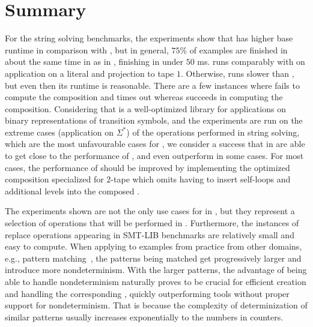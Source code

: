 \section{Summary}

For the string solving benchmarks, the experiments show that \mata has higher base runtime in comparison with \mona, but in general, $75 \%$ of examples are finished in about the same time in \mata as in \mona, finishing in under $50$ ms.
\mata runs comparably with \mona on application on a literal and projection to tape $1$.
Otherwise, \mata runs slower than \mona, but even then its runtime is reasonable.
There are a few instances where \mata fails to compute the composition and times out whereas \mona succeeds in computing the composition.
Considering that \mona is a well-optimized library for applications on binary representations of transition symbols, and the experiments are run on the extreme cases (application on $\Sigma^*$) of the operations performed in string solving, which are the most unfavourable cases for \mata, we consider a success that \nfts in \mata are able to get close to the performance of \mona, and even outperform \mona in some cases.
For most cases, the performance of \mata should be improved by implementing the optimized composition specialized for $2$-tape \nfts which omits having to insert self-loops and additional levels into the composed \nfts.

The experiments shown are not the only use cases for \nfts in \mata, but they represent a selection of operations that will be performed in \noodler.
Furthermore, the instances of replace operations appearing in SMT-LIB benchmarks are relatively small and easy to compute.
When applying \nfts to examples from practice from other domains, e.g., pattern matching~\cite{10.1007/978-3-031-30829-1_19}, the patterns being matched get progressively larger and introduce more nondeterminism.
With the larger patterns, the advantage of \mata being able to handle nondeterminism naturally proves to be crucial for efficient creation and handling the corresponding \nfts, quickly outperforming tools without proper support for nondeterminism.
That is because the complexity of determinization of similar patterns usually increases exponentially to the numbers in counters.

